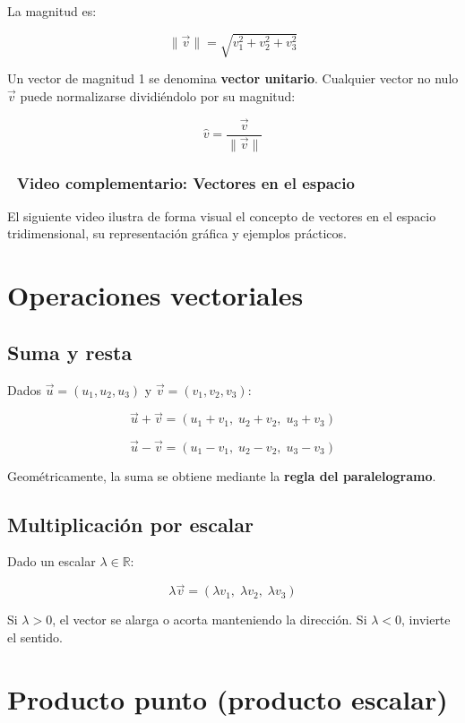 \documentclass[
]{book}
\begin{document}
La magnitud es:

\[
\|\vec{v}\| = \sqrt{v_1^2 + v_2^2 + v_3^2}
\]

Un vector de magnitud 1 se denomina \textbf{vector unitario}. Cualquier vector no nulo \(\vec{v}\) puede normalizarse dividiéndolo por su magnitud:

\[
\hat{v} = \frac{\vec{v}}{\|\vec{v}\|}
\]

\subsubsection{🎥 Video complementario: Vectores en el espacio}\label{video-complementario-vectores-en-el-espacio}

El siguiente video ilustra de forma visual el concepto de vectores en el espacio tridimensional, su representación gráfica y ejemplos prácticos.

\section{Operaciones vectoriales}\label{operaciones-vectoriales}

\subsection{Suma y resta}\label{suma-y-resta}

Dados \(\vec{u} = (u_1, u_2, u_3)\) y \(\vec{v} = (v_1, v_2, v_3)\):

\[
\vec{u} + \vec{v} = (u_1 + v_1,\; u_2 + v_2,\; u_3 + v_3)
\]

\[
\vec{u} - \vec{v} = (u_1 - v_1,\; u_2 - v_2,\; u_3 - v_3)
\]

Geométricamente, la suma se obtiene mediante la \textbf{regla del paralelogramo}.

\subsection{Multiplicación por escalar}\label{multiplicaciuxf3n-por-escalar}

Dado un escalar \(\lambda \in \mathbb{R}\):

\[
\lambda \vec{v} = (\lambda v_1,\; \lambda v_2,\; \lambda v_3)
\]

Si \(\lambda > 0\), el vector se alarga o acorta manteniendo la dirección. Si \(\lambda < 0\), invierte el sentido.

\section{Producto punto (producto escalar)}\label{producto-punto-producto-escalar}
\end{document}
